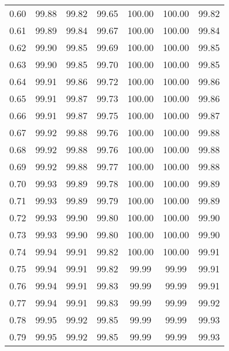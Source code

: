 \begin{tabular}{|c|c|c|c|c|c|c|}
      0.60 &     99.88 &     99.82 &      99.65 &  100.00 &     100.00 &         99.82 \\
      0.61 &     99.89 &     99.84 &      99.67 &  100.00 &     100.00 &         99.84 \\
      0.62 &     99.90 &     99.85 &      99.69 &  100.00 &     100.00 &         99.85 \\
      0.63 &     99.90 &     99.85 &      99.70 &  100.00 &     100.00 &         99.85 \\
      0.64 &     99.91 &     99.86 &      99.72 &  100.00 &     100.00 &         99.86 \\
      0.65 &     99.91 &     99.87 &      99.73 &  100.00 &     100.00 &         99.86 \\
      0.66 &     99.91 &     99.87 &      99.75 &  100.00 &     100.00 &         99.87 \\
      0.67 &     99.92 &     99.88 &      99.76 &  100.00 &     100.00 &         99.88 \\
      0.68 &     99.92 &     99.88 &      99.76 &  100.00 &     100.00 &         99.88 \\
      0.69 &     99.92 &     99.88 &      99.77 &  100.00 &     100.00 &         99.88 \\
      0.70 &     99.93 &     99.89 &      99.78 &  100.00 &     100.00 &         99.89 \\
      0.71 &     99.93 &     99.89 &      99.79 &  100.00 &     100.00 &         99.89 \\
      0.72 &     99.93 &     99.90 &      99.80 &  100.00 &     100.00 &         99.90 \\
      0.73 &     99.93 &     99.90 &      99.80 &  100.00 &     100.00 &         99.90 \\
      0.74 &     99.94 &     99.91 &      99.82 &  100.00 &     100.00 &         99.91 \\
      0.75 &     99.94 &     99.91 &      99.82 &   99.99 &      99.99 &         99.91 \\
      0.76 &     99.94 &     99.91 &      99.83 &   99.99 &      99.99 &         99.91 \\
      0.77 &     99.94 &     99.91 &      99.83 &   99.99 &      99.99 &         99.92 \\
      0.78 &     99.95 &     99.92 &      99.85 &   99.99 &      99.99 &         99.93 \\
      0.79 &     99.95 &     99.92 &      99.85 &   99.99 &      99.99 &         99.93 \\

\end{tabular}
